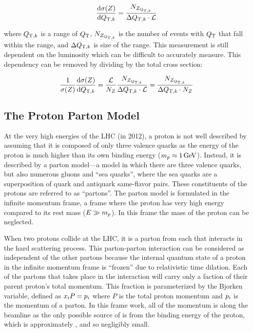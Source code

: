 \begin{equation}\label{eq:differ_xsec}
    \frac{\text{d}\sigma(Z)}{\text{d}Q_{\mathrm{T},k} }
    =
    \frac{N_{Z_{Q_{\mathrm{T},k}}}}{\Delta Q_{\mathrm{T},k} \cdot \mathcal{L}}
\end{equation}

where $Q_{\mathrm{T},k}$ is a range of $Q_{\mathrm{T}}$, $N_{Z_{Q_{\mathrm{T},k}}}$ is the number
of \Z events with $Q_{\mathrm{T}}$ that fall within the range, and $\Delta Q_{\mathrm{T},k}$
is size of the range. This measurement is still dependent on the luminosity
which can be difficult to accurately measure. This dependency can be removed by
dividing by the total cross section:

\begin{equation}\label{eq:normaized_differ_xsec}
    \frac{1}{\sigma(Z)} \frac{\text{d}\sigma(Z)}{\text{d}Q_{\mathrm{T},k} }
    =
    \frac{\mathcal{L}}{N_{Z}} \frac{N_{Z_{Q_{\mathrm{T},k}}}}{\Delta Q_{\mathrm{T},k} \cdot \mathcal{L}}
    =
    \frac{N_{Z_{Q_{\mathrm{T},k}}}}{\Delta Q_{\mathrm{T},k} \cdot N_{Z}}
\end{equation}

\subsection{The Proton Parton Model}
\label{ssec:parton_model}

At the very high energies of the LHC (\rootseight in 2012), a proton is not
well described by assuming that it is composed of only three valence quarks as
the energy of the proton is much higher than its own binding energy
($\ProtonMass \approx \SI{1}{\GeV}$). Instead, it is described by a parton
model---a model in which there are three valence quarks, but also numerous
gluons and ``sea quarks'', where the sea quarks are a superposition of quark
and antiquark same-flavor pairs. These constituents of the protons are referred
to as ``partons''. The parton model is formulated in the infinite momentum
frame, a frame where the proton has very high energy compared to its rest mass
($E \gg m_{p}$). In this frame the mass of the proton can be
neglected.

When two protons collide at the LHC, it is a parton from each that interacts in
the hard scattering process. This parton-parton interaction can be considered
as independent of the other partons because the internal quantum state of a
proton in the infinite momentum frame is ``frozen'' due to relativistic time
dilation. Each of the partons that takes place in the interaction will carry
only a faction of their parent proton's total momentum. This fraction is
parameterized by the Bjorken  variable, defined as $x_{i} P
= p_{i}$ where $P$ is the total proton momentum and $p_{i}$ is the
momentum of a parton. In this frame work, all of the momentum is along the
beamline as the only possible source of \pt is from the binding energy of the
proton, which is approximately \ProtonMass, and so negligibly small.


